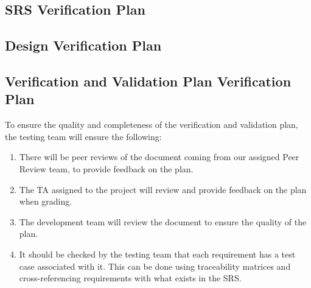 \documentclass[12pt, titlepage]{article}
\begin{document}
\subsection{SRS Verification Plan}




\subsection{Design Verification Plan}




\subsection{Verification and Validation Plan Verification Plan}

To ensure the quality and completeness of the verification and
validation plan, the testing team will ensure the following:

\begin{enumerate}
  \item There will be peer reviews of the document coming from our
    assigned Peer Review team, to provide feedback on the plan.
  \item The TA assigned to the project will review and provide
    feedback on the plan when grading.
  \item The development team will review the document to ensure the
    quality of the plan.
  \item It should be checked by the testing team that each
    requirement has a test case associated with it. This can be done
    using traceability matrices and cross-referencing requirements
    with what exists in the SRS.
\end{enumerate}
\end{document}
